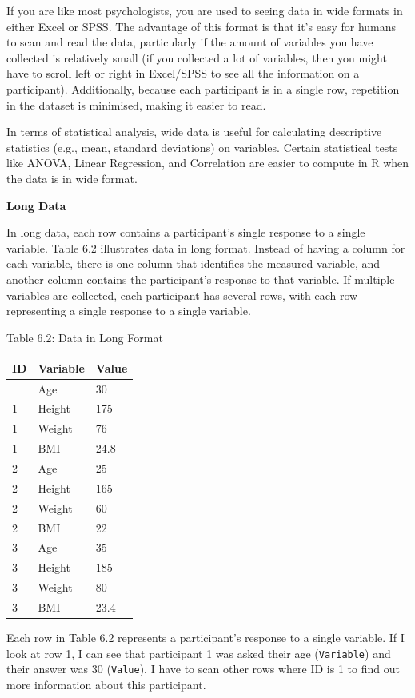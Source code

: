 \documentclass[
]{book}
\begin{document}
If you are like most psychologists, you are used to seeing data in wide formats in either Excel or SPSS. The advantage of this format is that it's easy for humans to scan and read the data, particularly if the amount of variables you have collected is relatively small (if you collected a lot of variables, then you might have to scroll left or right in Excel/SPSS to see all the information on a participant). Additionally, because each participant is in a single row, repetition in the dataset is minimised, making it easier to read.

In terms of statistical analysis, wide data is useful for calculating descriptive statistics (e.g., mean, standard deviations) on variables. Certain statistical tests like ANOVA, Linear Regression, and Correlation are easier to compute in R when the data is in wide format.

\textbf{Long Data}

In long data, each row contains a participant's single response to a single variable. Table 6.2 illustrates data in long format. Instead of having a column for each variable, there is one column that identifies the measured variable, and another column contains the participant's response to that variable. If multiple variables are collected, each participant has several rows, with each row representing a single response to a single variable.

Table 6.2: Data in Long Format

\begin{longtable}[]{@{}lll@{}}
\toprule\noalign{}
ID & Variable & Value \\
\midrule\noalign{}
\endhead
\bottomrule\noalign{}
\endlastfoot
1 & Age & 30 \\
1 & Height & 175 \\
1 & Weight & 76 \\
1 & BMI & 24.8 \\
2 & Age & 25 \\
2 & Height & 165 \\
2 & Weight & 60 \\
2 & BMI & 22 \\
3 & Age & 35 \\
3 & Height & 185 \\
3 & Weight & 80 \\
3 & BMI & 23.4 \\
\end{longtable}

Each row in Table 6.2 represents a participant's response to a single variable. If I look at row 1, I can see that participant 1 was asked their age (\texttt{Variable}) and their answer was 30 (\texttt{Value}). I have to scan other rows where ID is 1 to find out more information about this participant.
\end{document}
